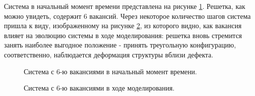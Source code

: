\documentclass[14pt,a4paper,report]{ncc}
\begin{document}
Система в начальный момент времени представлена на рисунке \ref{ris:image1}. Решетка, как можно увидеть, содержит 6 вакансий. Через некоторое количество шагов система пришла к виду, изображенному на рисунке \ref{ris:image2}, из которого видно, как вакансия влияет на эволюцию системы в ходе моделирования: решетка вновь стремится занять наиболее выгодное положение - принять треугольную конфигурацию, соответственно, наблюдается деформация структуры вблизи дефекта. 
\begin{figure}[h!]
\caption{Система с 6-ю вакансиями в начальный момент времени.}
\label{ris:image1}
\end{figure}
\begin{figure}[h!]
\caption{Система с 6-ю вакансиями в ходе моделирования.}
\label{ris:image2}
\end{figure}
\end{document}
